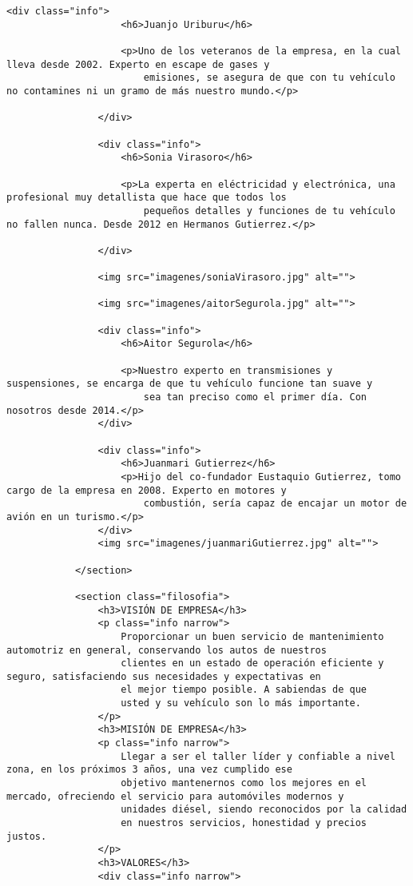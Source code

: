 \begin{lstlisting}[caption=mecanicos.html (LMSI)]
                <div class="info">
                    <h6>Juanjo Uriburu</h6>
    
                    <p>Uno de los veteranos de la empresa, en la cual lleva desde 2002. Experto en escape de gases y
                        emisiones, se asegura de que con tu vehículo no contamines ni un gramo de más nuestro mundo.</p>
    
                </div>
    
                <div class="info">
                    <h6>Sonia Virasoro</h6>
    
                    <p>La experta en eléctricidad y electrónica, una profesional muy detallista que hace que todos los
                        pequeños detalles y funciones de tu vehículo no fallen nunca. Desde 2012 en Hermanos Gutierrez.</p>
    
                </div>
    
                <img src="imagenes/soniaVirasoro.jpg" alt="">
    
                <img src="imagenes/aitorSegurola.jpg" alt="">
    
                <div class="info">
                    <h6>Aitor Segurola</h6>
    
                    <p>Nuestro experto en transmisiones y suspensiones, se encarga de que tu vehículo funcione tan suave y
                        sea tan preciso como el primer día. Con nosotros desde 2014.</p>
                </div>
    
                <div class="info">
                    <h6>Juanmari Gutierrez</h6>
                    <p>Hijo del co-fundador Eustaquio Gutierrez, tomo cargo de la empresa en 2008. Experto en motores y
                        combustión, sería capaz de encajar un motor de avión en un turismo.</p>
                </div>
                <img src="imagenes/juanmariGutierrez.jpg" alt="">
    
            </section>
    
            <section class="filosofia">
                <h3>VISIÓN DE EMPRESA</h3>
                <p class="info narrow">
                    Proporcionar un buen servicio de mantenimiento automotriz en general, conservando los autos de nuestros
                    clientes en un estado de operación eficiente y seguro, satisfaciendo sus necesidades y expectativas en
                    el mejor tiempo posible. A sabiendas de que
                    usted y su vehículo son lo más importante.
                </p>
                <h3>MISIÓN DE EMPRESA</h3>
                <p class="info narrow">
                    Llegar a ser el taller líder y confiable a nivel zona, en los próximos 3 años, una vez cumplido ese
                    objetivo mantenernos como los mejores en el mercado, ofreciendo el servicio para automóviles modernos y
                    unidades diésel, siendo reconocidos por la calidad
                    en nuestros servicios, honestidad y precios justos.
                </p>
                <h3>VALORES</h3>
                <div class="info narrow">
    

\end{lstlisting}
